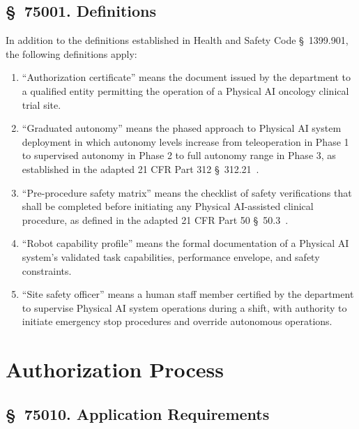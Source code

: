 \documentclass[11pt,letterpaper]{article}
\begin{document}
\subsection{\S~75001. Definitions}

In addition to the definitions established in Health and Safety Code
\S~1399.901, the following definitions apply:

\begin{enumerate}[label=(\alph*)]
\item ``Authorization certificate'' means the document issued by the department
  to a qualified entity permitting the operation of a Physical AI oncology
  clinical trial site.

\item ``Graduated autonomy'' means the phased approach to Physical AI system
  deployment in which autonomy levels increase from teleoperation in Phase 1
  to supervised autonomy in Phase 2 to full autonomy range in Phase 3, as
  established in the adapted 21 CFR Part 312 \S~312.21~\cite{cfr312adapt}.

\item ``Pre-procedure safety matrix'' means the checklist of safety
  verifications that shall be completed before initiating any Physical
  AI-assisted clinical procedure, as defined in the adapted 21 CFR Part 50
  \S~50.3~\cite{cfr50adapt}.

\item ``Robot capability profile'' means the formal documentation of a Physical
  AI system's validated task capabilities, performance envelope, and safety
  constraints.

\item ``Site safety officer'' means a human staff member certified by the
  department to supervise Physical AI system operations during a shift, with
  authority to initiate emergency stop procedures and override autonomous
  operations.
\end{enumerate}

\section{Authorization Process}

\subsection{\S~75010. Application Requirements}
\end{document}
